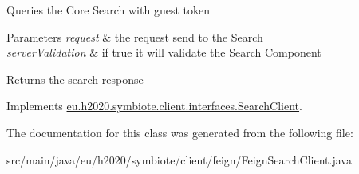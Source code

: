 Queries the Core Search with guest token


\begin{DoxyParams}{Parameters}
{\em request} & the request send to the Search \\
\hline
{\em server\+Validation} & if true it will validate the Search Component \\
\hline
\end{DoxyParams}
\begin{DoxyReturn}{Returns}
the search response 
\end{DoxyReturn}


Implements \hyperlink{interfaceeu_1_1h2020_1_1symbiote_1_1client_1_1interfaces_1_1SearchClient_aba8a879a8b835f3db8e5e1ea674ffd25}{eu.\+h2020.\+symbiote.\+client.\+interfaces.\+Search\+Client}.



The documentation for this class was generated from the following file\+:\begin{DoxyCompactItemize}
\item 
src/main/java/eu/h2020/symbiote/client/feign/Feign\+Search\+Client.\+java\end{DoxyCompactItemize}
